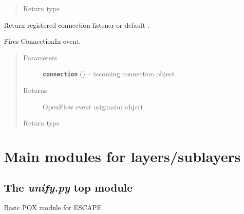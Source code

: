 \documentclass[letterpaper,10pt,english]{sphinxmanual}
\begin{document}
\begin{fulllineitems}
\begin{fulllineitems}
\begin{quote}
\begin{description}
\item[{Return type}] \leavevmode
{\hyperref[util/pox_extension:escape.util.pox_extension.ExtendedOFConnectionArbiter]{\emph{}}}

\end{description}\end{quote}

\end{fulllineitems}


\begin{fulllineitems}
\label{util/pox_extension:escape.util.pox_extension.ExtendedOFConnectionArbiter.getNexus}
Return registered connection listener or default .

Fires ConnectionIn event.
\begin{quote}\begin{description}
\item[{Parameters}] \leavevmode
\textbf{\texttt{connection}} () -- incoming connection object

\item[{Returns}] \leavevmode
OpenFlow event originator object

\item[{Return type}] \leavevmode
{}

\end{description}\end{quote}

\end{fulllineitems}


\end{fulllineitems}



\section{Main modules for layers/sublayers}
\label{index:main-modules-for-layers-sublayers}

\subsection{The \emph{unify.py} top module}
\label{unify:module-unify}\label{unify:the-unify-py-top-module}\label{unify::doc}
Basic POX module for ESCAPE
\end{document}
